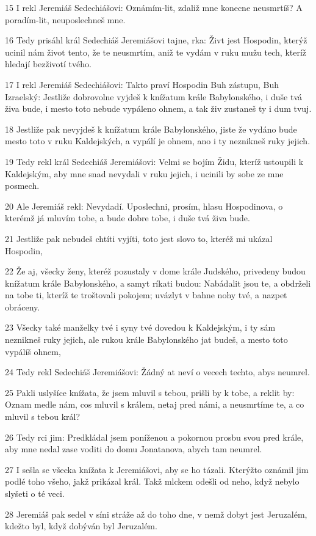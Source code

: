\par 15 I rekl Jeremiáš Sedechiášovi: Oznámím-lit, zdaliž mne konecne neusmrtíš? A poradím-lit, neuposlechneš mne.
\par 16 Tedy prisáhl král Sedechiáš Jeremiášovi tajne, rka: Živt jest Hospodin, kterýž ucinil nám život tento, že te neusmrtím, aniž te vydám v ruku mužu tech, kteríž hledají bezživotí tvého.
\par 17 I rekl Jeremiáš Sedechiášovi: Takto praví Hospodin Buh zástupu, Buh Izraelský: Jestliže dobrovolne vyjdeš k knížatum krále Babylonského, i duše tvá živa bude, i mesto toto nebude vypáleno ohnem, a tak živ zustaneš ty i dum tvuj.
\par 18 Jestliže pak nevyjdeš k knížatum krále Babylonského, jiste že vydáno bude mesto toto v ruku Kaldejských, a vypálí je ohnem, ano i ty neznikneš ruky jejich.
\par 19 Tedy rekl král Sedechiáš Jeremiášovi: Velmi se bojím Židu, kteríž ustoupili k Kaldejským, aby mne snad nevydali v ruku jejich, i ucinili by sobe ze mne posmech.
\par 20 Ale Jeremiáš rekl: Nevydadí. Uposlechni, prosím, hlasu Hospodinova, o kterémž já mluvím tobe, a bude dobre tobe, i duše tvá živa bude.
\par 21 Jestliže pak nebudeš chtíti vyjíti, toto jest slovo to, kteréž mi ukázal Hospodin,
\par 22 Že aj, všecky ženy, kteréž pozustaly v dome krále Judského, privedeny budou knížatum krále Babylonského, a samyt ríkati budou: Nabádalit jsou te, a obdrželi na tobe ti, kteríž te troštovali pokojem; uvázlyt v bahne nohy tvé, a nazpet obráceny.
\par 23 Všecky také manželky tvé i syny tvé dovedou k Kaldejským, i ty sám neznikneš ruky jejich, ale rukou krále Babylonského jat budeš, a mesto toto vypálíš ohnem,
\par 24 Tedy rekl Sedechiáš Jeremiášovi: Žádný at neví o vecech techto, abys neumrel.
\par 25 Pakli uslyšíce knížata, že jsem mluvil s tebou, prišli by k tobe, a reklit by: Oznam medle nám, cos mluvil s králem, netaj pred námi, a neusmrtíme te, a co mluvil s tebou král?
\par 26 Tedy rci jim: Predkládal jsem poníženou a pokornou prosbu svou pred krále, aby mne nedal zase voditi do domu Jonatanova, abych tam neumrel.
\par 27 I sešla se všecka knížata k Jeremiášovi, aby se ho tázali. Kterýžto oznámil jim podlé toho všeho, jakž prikázal král. Takž mlckem odešli od neho, když nebylo slyšeti o té veci.
\par 28 Jeremiáš pak sedel v síni stráže až do toho dne, v nemž dobyt jest Jeruzalém, kdežto byl, když dobýván byl Jeruzalém.


